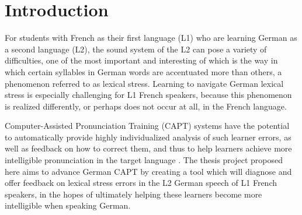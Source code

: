 %

%
\chapter{Introduction}
\label{chap:intro}




For students with French as their first language (L1) who are learning German as a second language (L2), the sound system of the L2 can pose a variety of difficulties, one of the most important and interesting of which is the way in which certain syllables in German words are accentuated more than others, a phenomenon referred to as lexical stress. Learning to navigate German lexical stress is especially challenging for L1 French speakers, because this phenomenon is realized differently, or perhaps does not occur at all, in the French language. 

Computer-Assisted Pronunciation Training (CAPT) systems
have the potential to automatically provide highly individualized analysis of such learner errors, as well as feedback on how to correct them, and thus to help learners achieve more intelligible 
pronunciation in the target language \citep{Witt2012}. 
%
The thesis project proposed here aims to advance 
German CAPT %
by creating a tool which will diagnose and offer feedback on lexical stress errors in the L2 German speech of L1 French speakers, in the hopes of ultimately helping these learners 
become more intelligible when speaking German.

